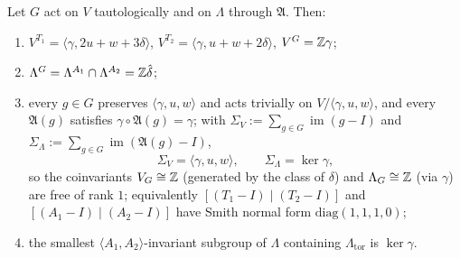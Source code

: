 \begin{lemma}
Let $G$ act on $V$ tautologically and on $\Lambda$ through $\mathfrak A$. Then:
\begin{enumerate}[label=(\roman*)]
\item $V^{T_1} = \langle \gamma, 2u+w+3\delta\rangle$, $V^{T_2} = \langle \gamma, u+w+2\delta\rangle$, $V^G = \mathbb{Z}\gamma$;
\item $\Lambda^G = \Lambda^{A_1} \cap \Lambda^{A_2} = \mathbb{Z}\hat\delta$;
\item every $g \in G$ preserves $\langle \gamma,u,w\rangle$ and acts trivially on $V/\langle\gamma,u,w\rangle$, and every $\mathfrak A(g)$ satisfies $\gamma \circ \mathfrak A(g) = \gamma$; with $\Sigma_V := \sum_{g\in G}\operatorname{im}(g-I)$ and $\Sigma_\Lambda := \sum_{g\in G}\operatorname{im}(\mathfrak A(g)-I)$,
\[
\Sigma_V = \langle \gamma,u,w\rangle, \qquad \Sigma_\Lambda = \ker\gamma,
\]
so the coinvariants $V_G \cong \mathbb{Z}$ (generated by the class of $\delta$) and $\Lambda_G \cong \mathbb{Z}$ (via $\gamma$) are free of rank $1$; equivalently $[(T_1-I)\mid (T_2-I)]$ and $[(A_1-I)\mid (A_2-I)]$ have Smith normal form $\mathrm{diag}(1,1,1,0)$;
\item the smallest $\langle A_1,A_2\rangle$-invariant subgroup of $\Lambda$ containing $\Lambda_{\mathrm{tor}}$ is $\ker\gamma$.
\end{enumerate}
\end{lemma}

